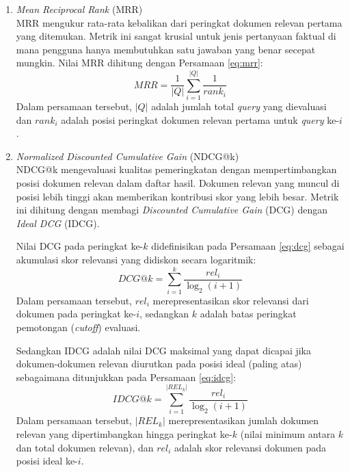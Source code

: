 \begin{enumerate}[noitemsep]
    \item \textit{Mean Reciprocal Rank} (MRR) \\
    MRR mengukur rata-rata kebalikan dari peringkat dokumen relevan pertama yang ditemukan. Metrik ini sangat krusial untuk jenis pertanyaan faktual di mana pengguna hanya membutuhkan satu jawaban yang benar secepat mungkin. Nilai MRR dihitung dengan Persamaan \ref{eq:mrr}:
    \begin{equation}
        MRR = \frac{1}{|Q|} \sum_{i=1}^{|Q|} \frac{1}{rank_i}
        \label{eq:mrr}
    \end{equation}
    \noindent
    Dalam persamaan tersebut, $|Q|$ adalah jumlah total \textit{query} yang dievaluasi dan $rank_i$ adalah posisi peringkat dokumen relevan pertama untuk \textit{query} ke-$i$.

    \item \textit{Normalized Discounted Cumulative Gain} (NDCG@k) \\
    NDCG@k mengevaluasi kualitas pemeringkatan dengan mempertimbangkan posisi dokumen relevan dalam daftar hasil. Dokumen relevan yang muncul di posisi lebih tinggi akan memberikan kontribusi skor yang lebih besar. Metrik ini dihitung dengan membagi \textit{Discounted Cumulative Gain} (DCG) dengan \textit{Ideal DCG} (IDCG).

    Nilai DCG pada peringkat ke-$k$ didefinisikan pada Persamaan \ref{eq:dcg} sebagai akumulasi skor relevansi yang didiskon secara logaritmik:
    \begin{equation}
        DCG@k = \sum_{i=1}^{k} \frac{rel_i}{\log_2(i+1)}
        \label{eq:dcg}
    \end{equation}
    \noindent
    Dalam persamaan tersebut, $rel_i$ merepresentasikan skor relevansi dari dokumen pada peringkat ke-$i$, sedangkan $k$ adalah batas peringkat pemotongan (\textit{cutoff}) evaluasi.

    Sedangkan IDCG adalah nilai DCG maksimal yang dapat dicapai jika dokumen-dokumen relevan diurutkan pada posisi ideal (paling atas) sebagaimana ditunjukkan pada Persamaan \ref{eq:idcg}:
    \begin{equation}
        IDCG@k = \sum_{i=1}^{|REL_k|} \frac{rel_i}{\log_2(i+1)}
        \label{eq:idcg}
    \end{equation}
    \noindent
    Dalam persamaan tersebut, $|REL_k|$ merepresentasikan jumlah dokumen relevan yang dipertimbangkan hingga peringkat ke-$k$ (nilai minimum antara $k$ dan total dokumen relevan), dan $rel_i$ adalah skor relevansi dokumen pada posisi ideal ke-$i$.


\end{enumerate}
